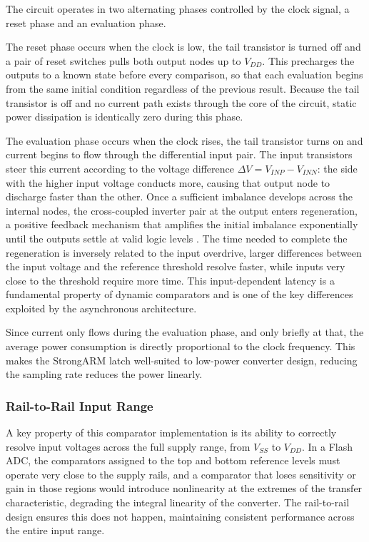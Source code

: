 The circuit operates in two alternating phases controlled by the clock signal, a reset phase and an evaluation phase.


The reset phase occurs when the clock is low, the tail transistor is turned off and a pair of reset switches pulls both output nodes up to $V_{DD}$. This precharges the outputs to a known state before every comparison, so that each evaluation begins from the same initial condition regardless of the previous result. Because the tail transistor is off and no current path exists through the core of the circuit, static power dissipation is identically zero during this phase.

The evaluation phase occurs when the clock rises, the tail transistor turns on and current begins to flow through the differential input pair. The input transistors steer this current according to the voltage difference $\Delta V = V_{INP} - V_{INN}$: the side with the higher input voltage conducts more, causing that output node to discharge faster than the other. Once a sufficient imbalance develops across the internal nodes, the cross-coupled inverter pair at the output enters regeneration, a positive feedback mechanism that amplifies the initial imbalance exponentially until the outputs settle at valid logic levels \cite{razavi_strongarm}. The time needed to complete the regeneration is inversely related to the input overdrive, larger differences between the input voltage and the reference threshold resolve faster, while inputs very close to the threshold require more time. This input-dependent latency is a fundamental property of dynamic comparators and is one of the key differences exploited by the asynchronous architecture.

Since current only flows during the evaluation phase, and only briefly at that, the average power consumption is directly proportional to the clock frequency. This makes the StrongARM latch well-suited to low-power converter design, reducing the sampling rate reduces the power linearly.

\subsubsection{Rail-to-Rail Input Range}

A key property of this comparator implementation is its ability to correctly resolve input voltages across the full supply range, from $V_{SS}$ to $V_{DD}$. In a Flash ADC, the comparators assigned to the top and bottom reference levels must operate very close to the supply rails, and a comparator that loses sensitivity or gain in those regions would introduce nonlinearity at the extremes of the transfer characteristic, degrading the integral linearity of the converter. The rail-to-rail design ensures this does not happen, maintaining consistent performance across the entire input range.

